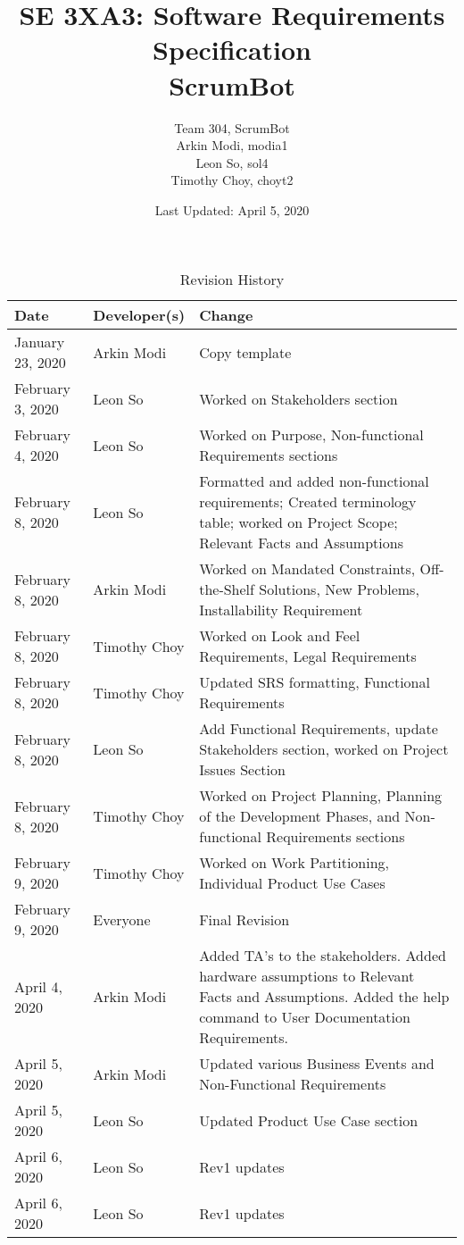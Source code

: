 \documentclass[12pt, titlepage]{article}
\title{SE 3XA3: Software Requirements Specification\\ScrumBot}
\author{
    Team 304, ScrumBot
        \\ Arkin Modi, modia1
        \\ Leon So, sol4
        \\ Timothy Choy, choyt2
}
\date{Last Updated: April 5, 2020}
\begin{document}
\maketitle

\tableofcontents
\listoftables
\listoffigures

\newpage

\begin{table}[!hbp]
    \caption{Revision History} \label{TblRevisionHistory}
    \begin{tabularx}{\textwidth}{llX}
        \toprule
            \textbf{Date} & \textbf{Developer(s)} & \textbf{Change}\\
        \midrule
            January 23, 2020 & Arkin Modi & Copy template\\
            February 3, 2020 & Leon So & Worked on Stakeholders section\\
            February 4, 2020 & Leon So & Worked on Purpose, Non-functional Requirements sections\\
            February 8, 2020 & Leon So & Formatted and added non-functional requirements; Created terminology table; worked on Project Scope; Relevant Facts and Assumptions\\
            February 8, 2020 & Arkin Modi & Worked on Mandated Constraints, Off-the-Shelf Solutions, New Problems, Installability Requirement\\
            February 8, 2020 & Timothy Choy & Worked on Look and Feel Requirements, Legal Requirements\\
            February 8, 2020 & Timothy Choy & Updated SRS formatting, Functional Requirements\\
            February 8, 2020 & Leon So & Add Functional Requirements, update Stakeholders section, worked on Project Issues Section\\
            February 8, 2020 & Timothy Choy & Worked on Project Planning, Planning of the Development Phases, and Non-functional Requirements sections\\
            February 9, 2020 & Timothy Choy & Worked on Work Partitioning, Individual Product Use Cases\\
            February 9, 2020 & Everyone & Final Revision\\
            April 4, 2020 & Arkin Modi & Added TA's to the stakeholders. Added hardware assumptions to Relevant Facts and Assumptions. Added the help command to User Documentation Requirements.\\
            April 5, 2020 & Arkin Modi & Updated various Business Events and Non-Functional Requirements\\
            April 5, 2020 & Leon So & Updated Product Use Case section\\
            April 6, 2020 & Leon So & Rev1 updates\\
            April 6, 2020 & Leon So & Rev1 updates\\
        \bottomrule
    \end{tabularx}
\end{table}
\end{document}
